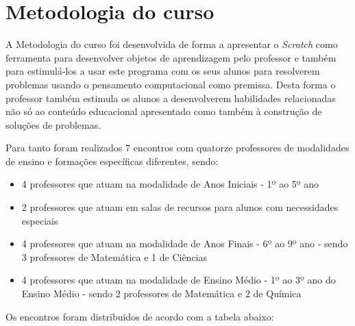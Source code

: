 \documentclass[12pt, openright, a4paper, brazil, english, french, spanish, bibjustif, openany, oneside]{abntex2}
\begin{document}

\chapter{Metodologia do curso}

A Metodologia do curso foi desenvolvida de forma a apresentar o \textit{Scratch} como ferramenta para desenvolver objetos de aprendizagem pelo professor e também para estimulá-los a usar este programa com os seus alunos para resolverem problemas usando o pensamento computacional como premissa. Desta forma o professor também estimula os alunos a desenvolverem habilidades relacionadas não só ao conteúdo educacional apresentado como também à construção de soluções de problemas. 

Para tanto foram realizados 7 encontros com quatorze professores de modalidades de ensino e formações específicas diferentes, sendo:

\begin{itemize}

\item 4 professores que atuam na modalidade de Anos Iniciais - 1º ao 5º ano
\item 2 professores que atuam em salas de recursos para alunos com necessidades especiais
\item 4 professores que atuam na modalidade de Anos Finais - 6º ao 9º ano - sendo 3 professores de Matemática e 1 de Ciências
\item 4 professores que atuam na modalidade de Ensino Médio - 1º ao 3º ano do Ensino Médio - sendo 2 professores de Matemática e 2 de Química

\end{itemize}


Os encontros foram distribuidos de acordo com a tabela abaixo: 
\end{document}
